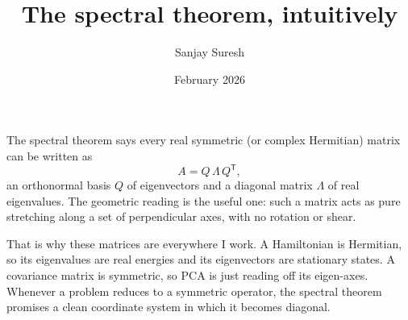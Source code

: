 \documentclass[11pt]{article}
\title{\textbf{The spectral theorem, intuitively}}
\author{Sanjay Suresh}
\date{February 2026}
\begin{document}
\maketitle

The spectral theorem says every real symmetric (or complex Hermitian) matrix can be written as
\[ A = Q\,\Lambda\,Q^{\mathsf{T}}, \]
an orthonormal basis $Q$ of eigenvectors and a diagonal matrix $\Lambda$ of real eigenvalues. The
geometric reading is the useful one: such a matrix acts as pure stretching along a set of
perpendicular axes, with no rotation or shear.

That is why these matrices are everywhere I work. A Hamiltonian is Hermitian, so its eigenvalues are
real energies and its eigenvectors are stationary states. A covariance matrix is symmetric, so PCA
is just reading off its eigen-axes. Whenever a problem reduces to a symmetric operator, the spectral
theorem promises a clean coordinate system in which it becomes diagonal.
\end{document}
